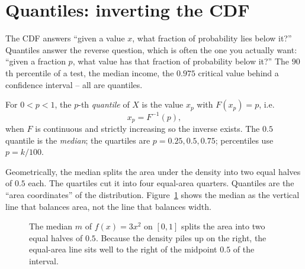 \section{Quantiles: inverting the CDF}
\label{ch10:quantiles}

The CDF answers ``given a value $x$, what fraction of probability lies below it?''
Quantiles answer the reverse question, which is often the one you actually want:
``given a fraction $p$, what value has that fraction of probability below it?'' The
$90$th percentile of a test, the median income, the $0.975$ critical value behind a
confidence interval -- all are quantiles.

\begin{definition}
\label{ch10:def-quantile}
For $0 < p < 1$, the $p$-th \emph{quantile} of $X$ is the value $x_p$ with
$F(x_p) = p$, i.e.
\[
  x_p = F^{-1}(p),
\]
when $F$ is continuous and strictly increasing so the inverse exists. The $0.5$
quantile is the \emph{median}; the quartiles are $p = 0.25, 0.5, 0.75$; percentiles
use $p = k/100$.
\end{definition}

Geometrically, the median splits the area under the density into two equal halves of
$0.5$ each. The quartiles cut it into four equal-area quarters. Quantiles are the
``area coordinates'' of the distribution. Figure~\ref{ch10:fig-median} shows the
median as the vertical line that balances area, not the line that balances width.

\begin{figure}[H]
\centering
{}
\caption{The median $m$ of $f(x)=3x^2$ on $[0,1]$ splits the area into two equal
halves of $0.5$. Because the density piles up on the right, the equal-area line sits
well to the right of the midpoint $0.5$ of the interval.}
\label{ch10:fig-median}
\end{figure}


